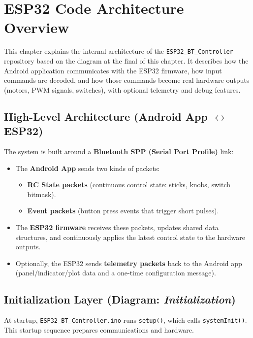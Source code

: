 \chapter{ESP32 Code Architecture Overview}

This chapter explains the internal architecture of the \texttt{ESP32\_BT\_Controller} repository based on the diagram at the final of this chapter.
It describes how the Android application communicates with the ESP32 firmware, how input commands are decoded,
and how those commands become real hardware outputs (motors, PWM signals, switches), with optional telemetry and debug features.

\section{High-Level Architecture (Android App \texorpdfstring{$\leftrightarrow$}{<->} ESP32)}

The system is built around a \textbf{Bluetooth SPP (Serial Port Profile)} link:

\begin{itemize}
    \item The \textbf{Android App} sends two kinds of packets:
    \begin{itemize}
        \item \textbf{RC State packets} (continuous control state: sticks, knobs, switch bitmask).
        \item \textbf{Event packets} (button press events that trigger short pulses).
    \end{itemize}
    \item The \textbf{ESP32 firmware} receives these packets, updates shared data structures, and continuously applies the
    latest control state to the hardware outputs.
    \item Optionally, the ESP32 sends \textbf{telemetry packets} back to the Android app (panel/indicator/plot data and a one-time configuration message).
\end{itemize}

\section{Initialization Layer (Diagram: \textit{Initialization})}

At startup, \texttt{ESP32\_BT\_Controller.ino} runs \texttt{setup()}, which calls \texttt{systemInit()}.
This startup sequence prepares communications and hardware.

